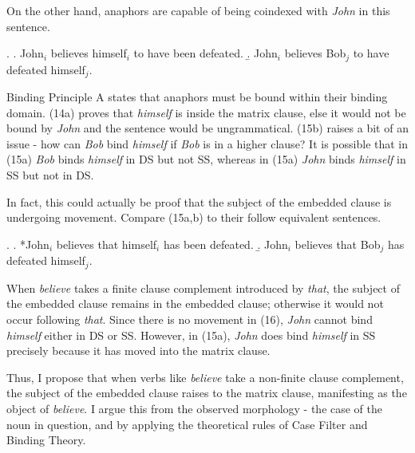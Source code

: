 \documentclass[a4paper, 11pt]{article}
\begin{document}
\begin{enumerate}[label=\textbf{\arabic*.}]
	On the other hand, anaphors are capable of being coindexed with \emph{John} in this sentence.

	\ex.
		\a. John$_{i}$ believes himself$_{i}$ to have been defeated.
		\b. John$_{i}$ believes Bob$_{j}$ to have defeated himself$_{j}$.

	Binding Principle A states that anaphors must be bound within their binding domain.
	(14a) proves that \emph{himself} is inside the matrix clause, else it would not be bound by \emph{John}
	and the sentence would be ungrammatical. (15b) raises a bit of an issue - how can \emph{Bob} bind
	\emph{himself} if \emph{Bob} is in a higher clause? It is possible that in (15a) \emph{Bob} binds
	\emph{himself} in DS but not SS, whereas in (15a) \emph{John} binds \emph{himself} in SS but not in DS.

	In fact, this could actually be proof that the subject of the embedded clause is undergoing movement.
	Compare (15a,b) to their follow equivalent sentences.

	\ex.
	\a. *John$_{i}$ believes that himself$_{i}$ has been defeated.
	\b. John$_{i}$ believes that Bob$_{j}$ has defeated himself$_{j}$.

	When \emph{believe} takes a finite clause complement introduced by \emph{that}, the subject of the embedded
	clause remains in the embedded clause; otherwise it would not occur following \emph{that}. Since there is no
	movement in (16), \emph{John} cannot bind \emph{himself} either in DS or SS. However, in (15a), \emph{John} does
	bind \emph{himself} in SS precisely because it has moved into the matrix clause.

	Thus, I propose that when verbs like \emph{believe} take a non-finite clause complement, the subject of the
	embedded clause raises to the matrix clause, manifesting as the object of \emph{believe}. I argue this from
	the observed morphology - the case of the noun in question, and by applying the theoretical rules of Case Filter
	and Binding Theory.

\end{enumerate}
\end{document}
